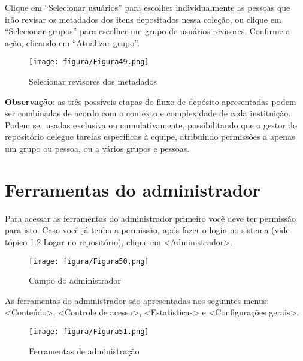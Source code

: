 \documentclass[12pt,hidelinks]{article}
\begin{document}
    Clique em “Selecionar usuários” para escolher individualmente as pessoas que irão revisar os metadados dos itens depositados nessa coleção, ou clique em “Selecionar grupos” para escolher um grupo de usuários revisores. Confirme a ação, clicando em “Atualizar grupo”.
    
    \begin{figure}[!htp]
                \centering
                \texttt{[image: figura/Figura49.png]}
                \caption{Selecionar revisores dos metadados}
            \label{Rotulo}
        \end{figure}

    \singlespacing
    
    \textbf{Observação}: as três possíveis etapas do fluxo de depósito apresentadas podem ser combinadas de acordo com o contexto e complexidade de cada instituição. Podem ser usadas exclusiva ou cumulativamente, possibilitando que o gestor do repositório delegue tarefas específicas à equipe, atribuindo permissões a apenas um grupo ou pessoa, ou a vários grupos e pessoas.
    
\newpage

\section{Ferramentas do administrador}

\newpage
    
    Para acessar as ferramentas do administrador primeiro você deve ter permissão para isto. Caso você já tenha a permissão, após fazer o login no sistema (vide tópico 1.2 Logar no repositório), clique em <Administrador>.
    
    \begin{figure}[!htp]
                \centering
                \texttt{[image: figura/Figura50.png]}
                \caption{Campo do administrador}
            \label{Rotulo}
        \end{figure}
    
    As ferramentas do administrador são apresentadas nos seguintes menus: <Conteúdo>, <Controle de acesso>, <Estatísticas> e <Configurações gerais>.
    
    \begin{figure}[!htp]
                \centering
                \texttt{[image: figura/Figura51.png]}
                \caption{Ferramentas de administração}
            \label{Rotulo}
        \end{figure}
        
\end{document}
